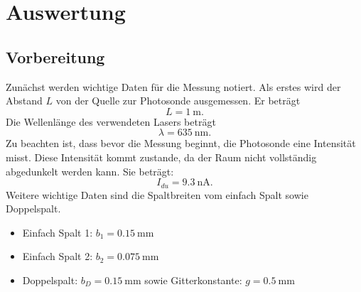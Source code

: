 \section{Auswertung}
\subsection{Vorbereitung}
Zunächst werden wichtige Daten für die Messung notiert.
Als erstes wird der Abstand $L$ von der Quelle zur Photosonde ausgemessen.
Er beträgt
\begin{equation*}
  L = \SI{1}{\meter}.
\end{equation*}
Die Wellenlänge des verwendeten Lasers beträgt
\begin{equation*}
  \lambda = \SI{635}{\nano\meter}.
\end{equation*}
Zu beachten ist, dass bevor die Messung beginnt, die Photosonde eine
Intensität misst. Diese Intensität kommt zustande, da der Raum nicht vollständig
abgedunkelt werden kann.
Sie beträgt:
\begin{equation*}
  I_{du} = \SI{9.3}{\nano\ampere}.
\end{equation*}
Weitere wichtige Daten sind die Spaltbreiten vom einfach Spalt sowie Doppelspalt.
\begin{itemize}
  \item Einfach Spalt 1: $ b_1 = \SI{0.15}{\milli\metre}$
  \item Einfach Spalt 2: $ b_2 = \SI{0.075}{\milli\metre}$
  \item Doppelspalt: $ b_D = \SI{0.15}{\milli\metre}$ sowie Gitterkonstante: $g = \SI{0.5}{\milli\metre}$
\end{itemize}
